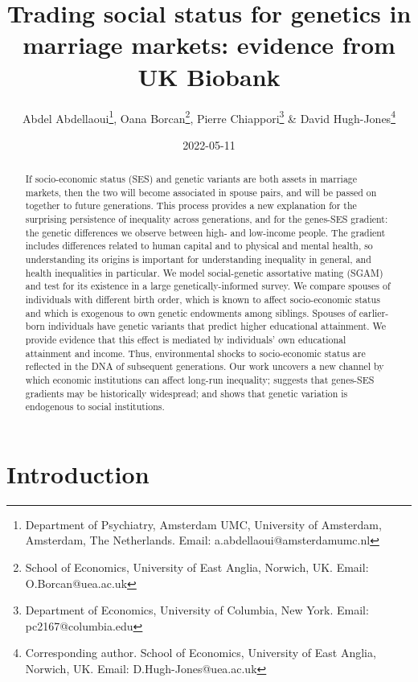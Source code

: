 \documentclass[
]{article}
\title{Trading social status for genetics in marriage markets: evidence from UK Biobank}
\author{Abdel Abdellaoui\thanks{Department of Psychiatry, Amsterdam UMC, University 
of Amsterdam, Amsterdam, The Netherlands. Email: a.abdellaoui@amsterdamumc.nl},
Oana Borcan\thanks{School of Economics, University of East Anglia, Norwich, 
UK. Email: O.Borcan@uea.ac.uk},
Pierre Chiappori\thanks{Department of Economics, University of Columbia, 
  New York. Email: pc2167@columbia.edu} \&
David Hugh-Jones\thanks{Corresponding author. School of Economics, 
University of East Anglia, Norwich, UK. Email: D.Hugh-Jones@uea.ac.uk}}
\date{2022-05-11}
\theoremstyle{definition}
\theoremstyle{definition}
\theoremstyle{definition}
\theoremstyle{definition}
\theoremstyle{remark}
\begin{document}
\maketitle
\begin{abstract}
If socio-economic status (SES) and genetic variants are both assets in marriage
markets, then the two will become associated in spouse pairs, and will be
passed on together to future generations. This process provides a new
explanation for the surprising persistence of inequality across generations,
and for the genes-SES gradient: the genetic differences we observe between
high- and low-income people. The gradient includes differences related
to human capital and to physical and mental health, so understanding its origins
is important for understanding inequality in general, and health inequalities
in particular. We model social-genetic assortative mating
(SGAM) and test for its existence in a large genetically-informed survey. We
compare spouses of individuals with different birth order, which is known to
affect socio-economic status and which is exogenous to own genetic endowments
among siblings. Spouses of earlier-born individuals have genetic variants that
predict higher educational attainment. We provide evidence that this effect is
mediated by individuals' own educational attainment and income. Thus,
environmental shocks to socio-economic status are reflected in the DNA of
subsequent generations. Our work uncovers a new channel by which economic
institutions can affect long-run inequality; suggests that genes-SES
gradients may be historically widespread; and shows that genetic variation
is endogenous to social institutions.
\end{abstract}

\normalem

\hypertarget{introduction}{%
\section{Introduction}\label{introduction}}
\end{document}
